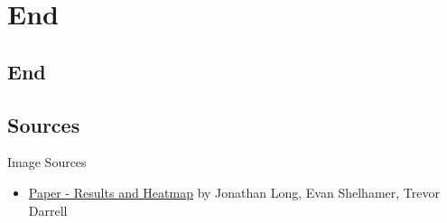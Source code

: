 \section*{End}
\subsection{End}
\subsection{Sources}
\begin{frame}{Image Sources}
    \begin{itemize}
        \item \href{http://arxiv.org/abs/1411.4038}{Paper - Results and Heatmap} by Jonathan Long, Evan Shelhamer, Trevor Darrell
    \end{itemize}
\end{frame}

